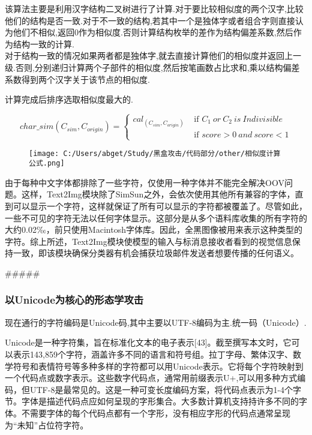 \documentclass[
]{article}
\begin{document}
该算法主要是利用汉字结构二叉树进行了计算.对于要比较相似度的两个汉字,比较他们的结构是否一致.对于不一致的结构,若其中一个是独体字或者组合字则直接认为他们不相似,返回0作为相似度.否则计算结构枚举的差作为结构偏差系数,然后作为结构一致的计算.\\
对于结构一致的情况如果两者都是独体字,就去直接计算他们的相似度并返回上一级.否则,分别递归计算两个子部件的相似度,然后按笔画数占比求和,乘以结构偏差系数得到两个汉字关于该节点的相似度.

计算完成后排序选取相似度最大的.

\[char\_sim(C_{sim},C_{origin})=\begin{cases}

  cal_(C_{sim},C_{origin})& \text{ if } C_1\ or\ C_2\ is\ Indivisible \\

  & \text{ if } score>0\ and\ score<1 

\end{cases}\]

\begin{figure}
\centering
\texttt{[image: C:/Users/abget/Study/黑盒攻击/代码部分/other/相似度计算公式.png]}
\caption{}
\end{figure}

由于每种中文字体都排除了⼀些字符，仅使用⼀种字体并不能完全解决OOV问题。这样，Text2Img模块除了SimSun之外，会依次使用其他所有兼容的字体，直到可以显示⼀个字符，这样就保证了所有可以显示的字符都被覆盖了。尽管如此，⼀些不可见的字符无法以任何字体显示。这部分是从多个语料库收集的所有字符的⼤约0.02‰，前只使用Macintosh字体库。因此，全黑图像被用来表示这种类型的字符。综上所述，Text2Img模块使模型的输⼊与标消息接收者看到的视觉信息保持⼀致，即该模块确保分类器有机会捕获垃圾邮件发送者想要传播的任何语义。

\#\#\#\#\#

\hypertarget{ux4ee5unicodeux4e3aux6838ux5fc3ux7684ux5f62ux6001ux5b66ux653bux51fb}{%
\subsubsection{以Unicode为核心的形态学攻击}\label{ux4ee5unicodeux4e3aux6838ux5fc3ux7684ux5f62ux6001ux5b66ux653bux51fb}}

现在通行的字符编码是Unicode码,其中主要以UTF-8编码为主.统一码（Unicode）.

Unicode是⼀种字符集，旨在标准化文本的电子表示{[}43{]}。截至撰写本文时，它可以表示143,859个字符，涵盖许多不同的语言和符号组。拉丁字母、繁体汉字、数学符号和表情符号等多种多样的字符都可以用Unicode表示。它将每个字符映射到⼀个代码点或数字表示。这些数字代码点，通常用前缀表示U+,可以用多种方式编码，但UTF-8是最常见的。这是⼀种可变长度编码方案，将代码点表示为1-4个字节。字体是描述代码点应如何呈现的字形集合。⼤多数计算机支持持许多不同的字体。不需要字体的每个代码点都有⼀个字形，没有相应字形的代码点通常呈现为``未知''占位符字符。
\end{document}

